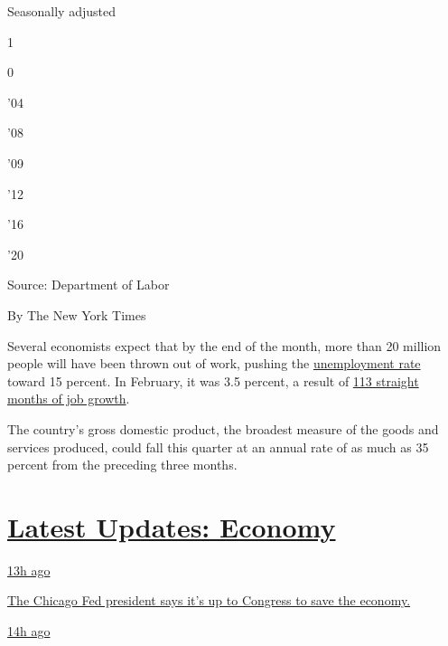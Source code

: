 Seasonally adjusted

1

0

'04

'08

'09

'12

'16

'20

Source: Department of Labor

By The New York Times

Several economists expect that by the end of the month, more than 20
million people will have been thrown out of work, pushing the
\href{https://www.nytimes3xbfgragh.onion/2020/04/16/business/economy/unemployment-numbers-coronavirus.html}{unemployment
rate} toward 15 percent. In February, it was 3.5 percent, a result of
\href{https://www.nytimes3xbfgragh.onion/2020/04/03/business/economy/coronavirus-jobs-report.html}{113
straight months of job growth}.

The country's gross domestic product, the broadest measure of the goods
and services produced, could fall this quarter at an annual rate of as
much as 35 percent from the preceding three months.

\hypertarget{latest-updates-economy}{%
\section{\texorpdfstring{\href{https://www.nytimes3xbfgragh.onion/live/2020/08/03/business/stock-market-today-coronavirus?action=click\&pgtype=Article\&state=default\&region=MAIN_CONTENT_1\&context=storylines_live_updates}{Latest
Updates:
Economy}}{Latest Updates: Economy}}\label{latest-updates-economy}}

\href{https://www.nytimes3xbfgragh.onion/live/2020/08/03/business/stock-market-today-coronavirus?action=click\&pgtype=Article\&state=default\&region=MAIN_CONTENT_1\&context=storylines_live_updates\#the-chicago-fed-president-says-its-up-to-congress-to-save-the-economy}{13h
ago}

\href{https://www.nytimes3xbfgragh.onion/live/2020/08/03/business/stock-market-today-coronavirus?action=click\&pgtype=Article\&state=default\&region=MAIN_CONTENT_1\&context=storylines_live_updates\#the-chicago-fed-president-says-its-up-to-congress-to-save-the-economy}{The
Chicago Fed president says it's up to Congress to save the economy.}

\href{https://www.nytimes3xbfgragh.onion/live/2020/08/03/business/stock-market-today-coronavirus?action=click\&pgtype=Article\&state=default\&region=MAIN_CONTENT_1\&context=storylines_live_updates\#faa-says-boeing-has-effectively-mitigated-defects-in-the-737-max}{14h
ago}


